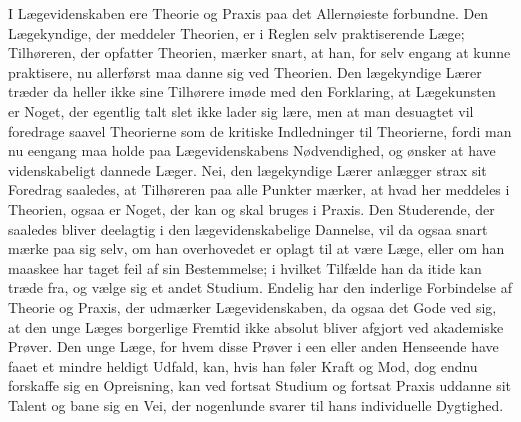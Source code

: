 \documentclass[12pt,a4paper]{book}
\newcommand{\opage}[1]{\marginnote{\footnotesize\textit{[#1]}}}
\begin{document}
I Lægevidenskaben ere Theorie og Praxis paa det Allernøieste forbundne. Den
Lægekyndige, der meddeler Theorien, er i Reglen selv praktiserende Læge;
Tilhøreren, der opfatter Theorien, mærker snart, at han, for selv engang at
kunne praktisere, nu allerførst maa danne sig ved Theorien. Den lægekyndige
Lærer træder da heller ikke sine Tilhørere imøde med den Forklaring, at
Lægekunsten er Noget, der egentlig talt slet ikke lader sig lære, men at
man desuagtet vil foredrage saavel Theorierne som de kritiske Indledninger
til Theorierne, fordi man nu eengang maa holde paa Lægevidenskabens
Nødvendighed, og ønsker at have videnskabeligt dannede Læger. Nei, den
lægekyndige Lærer anlægger strax sit Foredrag saaledes, at Tilhøreren paa
alle Punkter mærker, at hvad her meddeles i Theorien, ogsaa er Noget, der
kan og skal bruges i Praxis. Den Studerende, der saaledes bliver deelagtig
i den lægevidenskabelige Dannelse, vil
\opage{135} da ogsaa snart mærke paa sig selv, om han overhovedet er oplagt til at være
Læge, eller om han maaskee har taget feil af sin Bestemmelse; i hvilket
Tilfælde han da itide kan træde fra, og vælge sig et andet Studium. Endelig
har den inderlige Forbindelse af Theorie og Praxis, der udmærker
Lægevidenskaben, da ogsaa det Gode ved sig, at den unge Læges borgerlige
Fremtid ikke absolut bliver afgjort ved akademiske Prøver. Den unge Læge,
for hvem disse Prøver i een eller anden Henseende have faaet et mindre
heldigt Udfald, kan, hvis han føler Kraft og Mod, dog endnu forskaffe sig
en Opreisning, kan ved fortsat Studium og fortsat Praxis uddanne sit Talent
og bane sig en Vei, der nogenlunde svarer til hans individuelle Dygtighed.
\end{document}

